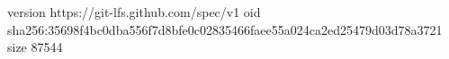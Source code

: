 version https://git-lfs.github.com/spec/v1
oid sha256:35698f4bc0dba556f7d8bfe0c02835466faee55a024ca2ed25479d03d78a3721
size 87544
